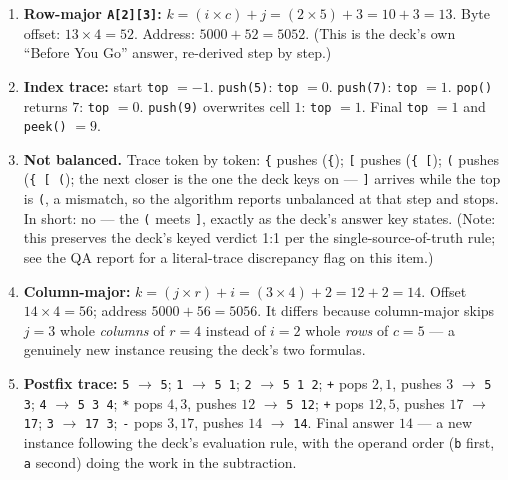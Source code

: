 \documentclass[11pt]{article}
\begin{document}
\begingroup\small
\begin{enumerate}
  \item \textbf{Row-major \texttt{A[2][3]}:} $k = (i \times c) + j = (2 \times 5) + 3 = 10 + 3 = 13$. Byte offset: $13 \times 4 = 52$. Address: $5000 + 52 = 5052$. (This is the deck's own ``Before You Go'' answer, re-derived step by step.)
  \item \textbf{Index trace:} start \texttt{top} $= -1$. \texttt{push(5)}: \texttt{top} $= 0$. \texttt{push(7)}: \texttt{top} $= 1$. \texttt{pop()} returns $7$: \texttt{top} $= 0$. \texttt{push(9)} overwrites cell $1$: \texttt{top} $= 1$. Final \texttt{top} $= 1$ and \texttt{peek()} $= 9$.
  \item \textbf{Not balanced.} Trace token by token: \texttt{\{} pushes (\texttt{\{}); \texttt{[} pushes (\texttt{\{ [}); \texttt{(} pushes (\texttt{\{ [ (}); the next closer is the one the deck keys on --- \texttt{]} arrives while the top is \texttt{(}, a mismatch, so the algorithm reports unbalanced at that step and stops. In short: no --- the \texttt{(} meets \texttt{]}, exactly as the deck's answer key states. (Note: this preserves the deck's keyed verdict 1:1 per the single-source-of-truth rule; see the QA report for a literal-trace discrepancy flag on this item.)
  \item \textbf{Column-major:} $k = (j \times r) + i = (3 \times 4) + 2 = 12 + 2 = 14$. Offset $14 \times 4 = 56$; address $5000 + 56 = 5056$. It differs because column-major skips $j = 3$ whole \emph{columns} of $r = 4$ instead of $i = 2$ whole \emph{rows} of $c = 5$ --- a genuinely new instance reusing the deck's two formulas.
  \item \textbf{Postfix trace:} \texttt{5} $\to$ \texttt{5}; \texttt{1} $\to$ \texttt{5 1}; \texttt{2} $\to$ \texttt{5 1 2}; \texttt{+} pops $2, 1$, pushes $3$ $\to$ \texttt{5 3}; \texttt{4} $\to$ \texttt{5 3 4}; \texttt{*} pops $4, 3$, pushes $12$ $\to$ \texttt{5 12}; \texttt{+} pops $12, 5$, pushes $17$ $\to$ \texttt{17}; \texttt{3} $\to$ \texttt{17 3}; \texttt{-} pops $3, 17$, pushes $14$ $\to$ \texttt{14}. Final answer $14$ --- a new instance following the deck's evaluation rule, with the operand order (\texttt{b} first, \texttt{a} second) doing the work in the subtraction.
\end{enumerate}
\endgroup



\end{document}
